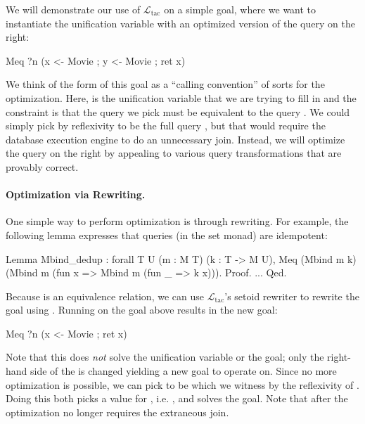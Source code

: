 \documentclass[preprint]{sigplanconf}
\newcommand{\ltac}[0]{\ensuremath{\mathcal{L}_{\mathrm{tac}}}}
\begin{document}
We will demonstrate our use of \ltac{} on a simple goal, where we want to instantiate the unification variable  with an optimized version of the query on the right:
\begin{coq}
Meq ?n (x <- Movie ; y <- Movie ; ret x)
\end{coq}
We think of the form of this goal as a ``calling convention'' of sorts for the optimization.
Here,  is the unification variable that we are trying to fill in and the constraint is that the query we pick must be equivalent to the query .
We could simply pick  by reflexivity to be the full query , but that would require the database execution engine to do an unnecessary join.
Instead, we will optimize the query on the right by appealing to various query transformations that are provably correct.

\paragraph{Optimization via Rewriting.}
One simple way to perform optimization is through rewriting.
For example, the following lemma expresses that queries (in the set monad) are idempotent:
\begin{coq}
Lemma Mbind_dedup : forall {T U} (m : M T) (k : T -> M U),
  Meq (Mbind m k) (Mbind m (fun x => Mbind m (fun _ => k x))).
Proof. ... Qed.
\end{coq}
Because  is an equivalence relation, we can use \ltac's setoid rewriter to rewrite the goal using .
Running  on the goal above results in the new goal:
\begin{coq}
Meq ?n (x <- Movie ; ret x)
\end{coq}
Note that this does \emph{not} solve the unification variable  or the goal; only the right-hand side of the  is changed yielding a new goal to operate on.
Since no more optimization is possible, we can pick  to be  which we witness by the reflexivity of .
Doing this both picks a value for , i.e. , and solves the goal.
Note that after the optimization  no longer requires the extraneous join.
\end{document}
